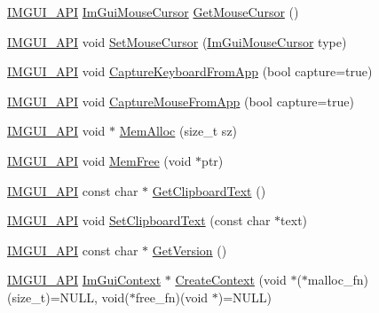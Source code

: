 \begin{DoxyCompactItemize}
\mbox{\hyperlink{imgui_8h_a43829975e84e45d1149597467a14bbf5}{I\+M\+G\+U\+I\+\_\+\+A\+PI}} \mbox{\hyperlink{imgui_8h_a9223d6c82bb5d12c2eab5f829ca520ef}{Im\+Gui\+Mouse\+Cursor}} \mbox{\hyperlink{namespace_im_gui_a3b955bb840a2411f7c19ac6687d57392}{Get\+Mouse\+Cursor}} ()
\item 
\mbox{\hyperlink{imgui_8h_a43829975e84e45d1149597467a14bbf5}{I\+M\+G\+U\+I\+\_\+\+A\+PI}} void \mbox{\hyperlink{namespace_im_gui_ae212a3516efcba50a684df202c8e63ad}{Set\+Mouse\+Cursor}} (\mbox{\hyperlink{imgui_8h_a9223d6c82bb5d12c2eab5f829ca520ef}{Im\+Gui\+Mouse\+Cursor}} type)
\item 
\mbox{\hyperlink{imgui_8h_a43829975e84e45d1149597467a14bbf5}{I\+M\+G\+U\+I\+\_\+\+A\+PI}} void \mbox{\hyperlink{namespace_im_gui_af382f9360d73917a9e9c0d26b5797552}{Capture\+Keyboard\+From\+App}} (bool capture=true)
\item 
\mbox{\hyperlink{imgui_8h_a43829975e84e45d1149597467a14bbf5}{I\+M\+G\+U\+I\+\_\+\+A\+PI}} void \mbox{\hyperlink{namespace_im_gui_a3a86fbf0d334b30dc16fb44955f1ce54}{Capture\+Mouse\+From\+App}} (bool capture=true)
\item 
\mbox{\hyperlink{imgui_8h_a43829975e84e45d1149597467a14bbf5}{I\+M\+G\+U\+I\+\_\+\+A\+PI}} void $\ast$ \mbox{\hyperlink{namespace_im_gui_a15efb2cac4a54b35489c5984ba1b661a}{Mem\+Alloc}} (size\+\_\+t sz)
\item 
\mbox{\hyperlink{imgui_8h_a43829975e84e45d1149597467a14bbf5}{I\+M\+G\+U\+I\+\_\+\+A\+PI}} void \mbox{\hyperlink{namespace_im_gui_a269ec695c6e722ec3da85dae37f0675d}{Mem\+Free}} (void $\ast$ptr)
\item 
\mbox{\hyperlink{imgui_8h_a43829975e84e45d1149597467a14bbf5}{I\+M\+G\+U\+I\+\_\+\+A\+PI}} const char $\ast$ \mbox{\hyperlink{namespace_im_gui_a11837daee819fd90e17d80ab1eef1f99}{Get\+Clipboard\+Text}} ()
\item 
\mbox{\hyperlink{imgui_8h_a43829975e84e45d1149597467a14bbf5}{I\+M\+G\+U\+I\+\_\+\+A\+PI}} void \mbox{\hyperlink{namespace_im_gui_aa4824a1b351c063b4aff9b9f4fb5fd4d}{Set\+Clipboard\+Text}} (const char $\ast$text)
\item 
\mbox{\hyperlink{imgui_8h_a43829975e84e45d1149597467a14bbf5}{I\+M\+G\+U\+I\+\_\+\+A\+PI}} const char $\ast$ \mbox{\hyperlink{namespace_im_gui_a6488c3cfa6331c8a1e93769e580ce020}{Get\+Version}} ()
\item 
\mbox{\hyperlink{imgui_8h_a43829975e84e45d1149597467a14bbf5}{I\+M\+G\+U\+I\+\_\+\+A\+PI}} \mbox{\hyperlink{struct_im_gui_context}{Im\+Gui\+Context}} $\ast$ \mbox{\hyperlink{namespace_im_gui_a98a4fecf50da4fb3489cee71a72cc577}{Create\+Context}} (void $\ast$($\ast$malloc\+\_\+fn)(size\+\_\+t)=N\+U\+LL, void($\ast$free\+\_\+fn)(void $\ast$)=N\+U\+LL)

\end{DoxyCompactItemize}
